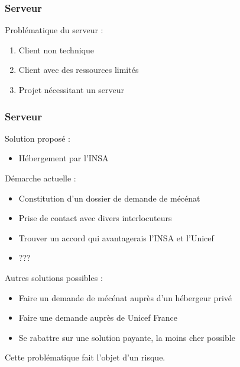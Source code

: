 \begin{frame}
	\frametitle{Serveur}

    Problématique du serveur :
      \begin{enumerate}
        \item Client non technique
        \item Client avec des ressources limités
        \item Projet nécessitant un serveur
      \end{enumerate}
      
\end{frame}


\begin{frame}
	\frametitle{Serveur}
	Solution proposé :
	\begin{itemize}	
    \item Hébergement par l'INSA
    \end{itemize}
    Démarche actuelle :
      \begin{itemize}
        \item Constitution d'un dossier de demande de mécénat
        \item Prise de contact avec divers interlocuteurs
        \item Trouver un accord qui avantagerais l'INSA et l'Unicef
        \item ???
      \end{itemize}
    Autres solutions possibles :
      \begin{itemize}
        \item Faire un demande de mécénat auprès d'un hébergeur privé

        
        \item Faire une demande auprès de Unicef France
        \item Se rabattre sur une solution payante, la moins cher possible
      \end{itemize}
    \begin{center}
    \begin{tiny}
    Cette problématique fait l'objet d'un risque.
    \end{tiny}
    \end{center}
\end{frame}